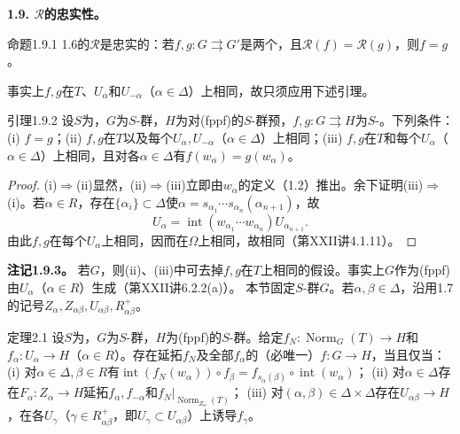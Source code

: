 \textbf{1.9. $\mathcal R$的忠实性。}
\begin{SGAresult}{命题}{1.9.1}
1.6的$\mathcal R$是忠实的：若$f,g:G\rightrightarrows G'$是两个，且$\mathcal R(f)=\mathcal R(g)$，则$f=g$。
\end{SGAresult}
事实上$f,g$在$T$、$U_\alpha$和$U_{-\alpha}$（$\alpha\in\Delta$）上相同，故只须应用下述引理。
\begin{SGAresult}{引理}{1.9.2}
设$S$为，$G$为$S$-群，$H$为对(fppf)的$S$-群预，$f,g:G\rightrightarrows H$为$S$-。下列条件：(i) $f=g$；(ii) $f,g$在$T$以及每个$U_\alpha,U_{-\alpha}$（$\alpha\in\Delta$）上相同；(iii) $f,g$在$T$和每个$U_\alpha$（$\alpha\in\Delta$）上相同，且对各$\alpha\in\Delta$有$f(w_\alpha)=g(w_\alpha)$。
\end{SGAresult}
\begin{proof}
(i)$\Rightarrow$(ii)显然，(ii)$\Rightarrow$(iii)立即由$w_\alpha$的定义（1.2）推出。余下证明(iii)$\Rightarrow$(i)。若$\alpha\in R$，存在$\{\alpha_i\}\subset\Delta$使$\alpha=s_{\alpha_1}\cdots s_{\alpha_n}(\alpha_{n+1})$，故
\[U_\alpha=\operatorname{int}(w_{\alpha_1}\cdots w_{\alpha_n})U_{\alpha_{n+1}}.\]
由此$f,g$在每个$U_\alpha$上相同，因而在$\Omega$上相同，故相同（第XXII讲4.1.11）。
\end{proof}
\textbf{注记1.9.3。} 若$G$，则(ii)、(iii)中可去掉$f,g$在$T$上相同的假设。事实上$G$作为(fppf)由$U_\alpha$（$\alpha\in R$）生成（第XXII讲6.2.2(a)）。
本节固定$S$-群$G$。若$\alpha,\beta\in\Delta$，沿用1.7的记号$Z_\alpha,Z_{\alpha\beta},U_{\alpha\beta},R^+_{\alpha\beta}$。
\begin{SGAresult}{定理}{2.1}
设$S$为，$G$为$S$-群，$H$为(fppf)的$S$-群。给定$f_N:\operatorname{Norm}_G(T)\to H$和$f_\alpha:U_\alpha\to H$（$\alpha\in R$）。存在延拓$f_N$及全部$f_\alpha$的（必唯一）$f:G\to H$，当且仅当：
(i) 对$\alpha\in\Delta,\beta\in R$有$\operatorname{int}(f_N(w_\alpha))\circ f_\beta=f_{s_\alpha(\beta)}\circ\operatorname{int}(w_\alpha)$；
(ii) 对$\alpha\in\Delta$存在$F_\alpha:Z_\alpha\to H$延拓$f_\alpha,f_{-\alpha}$和$f_N|_{\operatorname{Norm}_{Z_\alpha}(T)}$；
(iii) 对$(\alpha,\beta)\in\Delta\times\Delta$存在$U_{\alpha\beta}\to H$，在各$U_\gamma$（$\gamma\in R^+_{\alpha\beta}$，即$U_\gamma\subset U_{\alpha\beta}$）上诱导$f_\gamma$。
\end{SGAresult}
